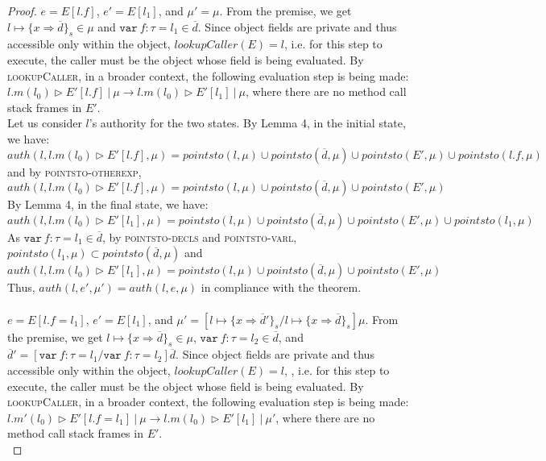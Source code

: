 \documentclass{llncs}
\newcommand{\keywadj}[1]{\mathtt{#1}}
\newcommand{\keyw}[1]{\keywadj{#1}~}
\begin{document}
\begin{proof}
\noindent{}
$e = E[l.f]$, $e' = E[l_1]$, and $\mu' = \mu$. From the premise, we get $l \mapsto \{ x \Rightarrow \overline{d} \}_{s} \in \mu$ and $\keyw{var} f : \tau = l_1 \in \overline{d}$. Since object fields are private and thus accessible only within the object, $lookupCaller(E) = l$, i.e. for this step to execute, the caller must be the object whose field is being evaluated. By \textsc{lookupCaller}, in a broader context, the following evaluation step is being made: \mbox{$l.m(l_0) \rhd E'[l.f]~|~\mu \longrightarrow l.m(l_0) \rhd E'[l_1]~|~\mu$}, where there are no method call stack frames in $E'$.\\

\noindent Let us consider $l$'s authority for the two states. By Lemma 4, in the initial state, we have:
\[
auth(l, l.m(l_0) \rhd E'[l.f], \mu) = pointsto(l, \mu) \cup pointsto(\overline{d}, \mu) \cup pointsto(E', \mu) \cup pointsto(l.f, \mu)
\]
and by \textsc{pointsto-otherexp},
\[
auth(l, l.m(l_0) \rhd E'[l.f], \mu) = pointsto(l, \mu) \cup pointsto(\overline{d}, \mu) \cup pointsto(E', \mu)
\]
By Lemma 4, in the final state, we have:
\[
auth(l, l.m(l_0) \rhd E'[l_1], \mu) = pointsto(l, \mu) \cup pointsto(\overline{d}, \mu) \cup pointsto(E', \mu) \cup pointsto(l_1, \mu)
\]
As $\keyw{var} f : \tau = l_1 \in \overline{d}$, by \textsc{pointsto-decls} and \textsc{pointsto-varl}, $pointsto(l_1, \mu) \subset pointsto(\overline{d}, \mu)$ and
\[
auth(l, l.m(l_0) \rhd E'[l_1], \mu) = pointsto(l, \mu) \cup pointsto(\overline{d}, \mu) \cup pointsto(E', \mu)
\]
Thus, $auth(l, e', \mu') = auth(l, e, \mu)$ in compliance with the theorem.\\\\


\noindent{}
$e = E[l.f = l_1]$, $e' = E[l_1]$, and $\mu' = [l \mapsto \{ x \Rightarrow \overline{d}' \}_{s}/l \mapsto \{ x \Rightarrow \overline{d} \}_{s}]\mu$. From the premise, we get $l \mapsto \{ x \Rightarrow \overline{d} \}_{s} \in \mu$, $\keyw{var} f:\tau = l_2 \in \overline{d}$, and $\overline{d}' = [\keyw{var} f : \tau = l_1/\keyw{var} f:\tau = l_2]\overline{d}$. Since object fields are private and thus accessible only within the object, $lookupCaller(E) = l$, , i.e. for this step to execute, the caller must be the object whose field is being evaluated. By \textsc{lookupCaller}, in a broader context, the following evaluation step is being made: \mbox{$l.m'(l_0) \rhd E'[l.f = l_1]~|~\mu \longrightarrow l.m(l_0) \rhd E'[l_1]~|~\mu'$}, where there are no method call stack frames in $E'$.\\


\end{proof}
\end{document}
